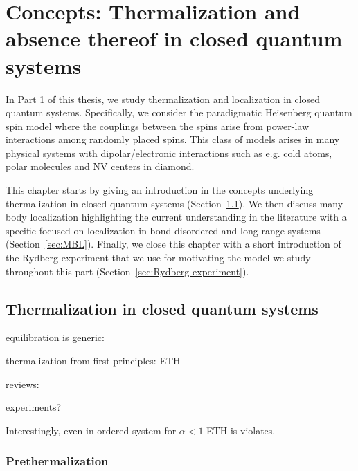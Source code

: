 \chapter{Concepts: Thermalization and absence thereof in closed quantum systems}\label{ch:another}

In Part 1 of this thesis, we study thermalization and localization in closed quantum systems. Specifically, we consider the paradigmatic Heisenberg quantum spin model where the couplings between the spins arise from power-law interactions among randomly placed spins. This class of models arises in many physical systems with dipolar/electronic interactions such as e.g. cold atoms, polar molecules and NV centers in diamond.

This chapter starts by giving an introduction in the concepts underlying thermalization in closed quantum systems (Section~\ref{sec:Thermalization-in-closed-QS}). We then discuss many-body localization highlighting the current understanding in the literature with a specific focused on localization in bond-disordered and long-range systems (Section~\ref{sec:MBL}). Finally, we close this chapter with a short introduction of the Rydberg experiment that we use for motivating the model we study throughout this part (Section~\ref{sec:Rydberg-experiment}).


\section{Thermalization in closed quantum systems}\label{sec:Thermalization-in-closed-QS}
equilibration is generic: \cite{reimannFoundationStatisticalMechanics2008,lindenQuantumMechanicalEvolution2009}

thermalization from first principles: ETH \cite{deutschQuantumStatisticalMechanics1991,srednickiChaosQuantumThermalization1994,rigolThermalizationItsMechanism2008}

reviews: \cite{gogolinEquilibrationThermalisationEmergence2016,dalessioQuantumChaosEigenstate2016,deutschEigenstateThermalizationHypothesis2018,moriThermalizationPrethermalizationIsolated2018}

experiments?

Interestingly, even in ordered system for $\alpha<1$ ETH is violates\cite{sugimotoEigenstateThermalizationLongRange2022}.


\subsection{Prethermalization}

